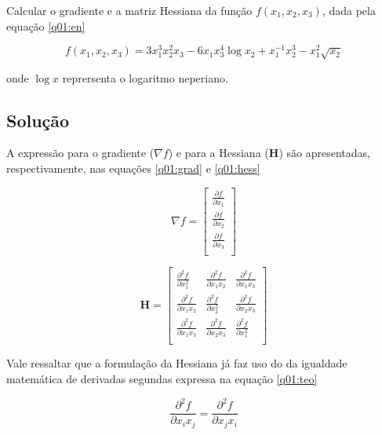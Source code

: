 \documentclass[10pt, a4paper]{article}
\begin{document}
Calcular o gradiente e a matriz Hessiana da função $f(x_1, x_2, x_3)$, dada pela equação \cref{q01:en}

\begin{equation}\label{q01:en}
  f(x_1, x_2, x_3) = 3x_1^3x_2^2x_3 - 6x_1x_3^4\log{x_2} + x_1^{-1}x_2^3 - x_1^2\sqrt{x_2}
\end{equation}

onde $\log{x}$ reprersenta o logaritmo neperiano.

\subsection{Solução}

A expressão para o gradiente ($\nabla f$) e para a Hessiana ($\mathbf{H}$) são apresentadas, respectivamente, nas equações \cref{q01:grad} e \cref{q01:hess}

\begin{equation}\label{q01:grad} 
  \nabla f =
  \left[ {\begin{array}{c}
    \frac{\partial f}{\partial x_1} \\
    \frac{\partial f}{\partial x_2} \\
    \frac{\partial f}{\partial x_3} \\
  \end{array} } \right]
\end{equation}

\begin{equation}\label{q01:hess} 
  \mathbf{H} =
  \left[ {\begin{array}{ccc}
    \frac{\partial^2 f}{\partial x_1^2} & \frac{\partial^2 f}{\partial x_1x_2} & \frac{\partial^2 f}{\partial x_1x_3} \\
    \frac{\partial^2 f}{\partial x_1x_2} & \frac{\partial^2 f}{\partial x_2^2} & \frac{\partial^2 f}{\partial x_2x_3} \\
    \frac{\partial^2 f}{\partial x_1x_3} & \frac{\partial^2 f}{\partial x_2x_3} & \frac{\partial^2 f}{\partial x_1^2} \\
  \end{array} } \right]
\end{equation}

Vale ressaltar que a formulação da Hessiana já faz uso do da igualdade matemática de derivadas segundas expressa na equação \cref{q01:teo}

\begin{equation}\label{q01:teo}
  \frac{\partial^2 f}{\partial x_i x_j} = \frac{\partial^2 f}{\partial x_j x_i}
\end{equation}
\end{document}
